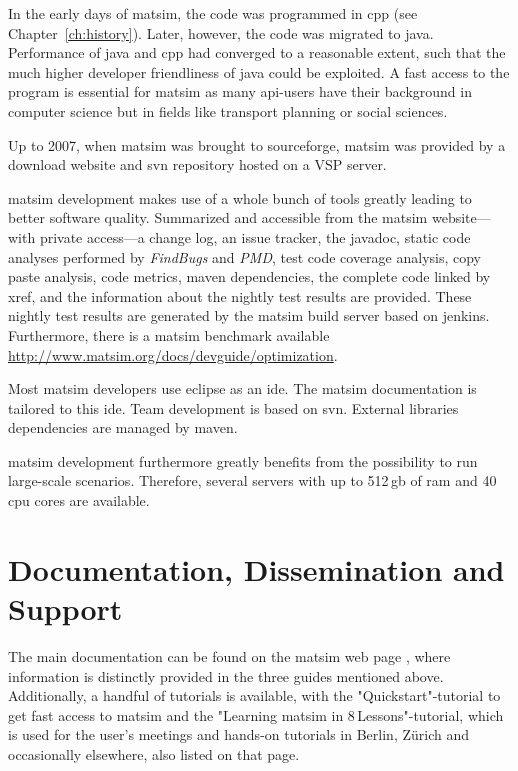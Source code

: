 In the early days of \gls{matsim}, the code was programmed in \gls{cpp} (see Chapter~\ref{ch:history}). Later, however, the code was migrated to \gls{java}. Performance of \gls{java} and \gls{cpp} had converged to a reasonable extent, such that the much higher developer friendliness of \gls{java} could be exploited. A fast access to the program is essential for \gls{matsim} as many \gls{api}-users have their background in computer science but in fields like transport planning or social sciences. 

Up to 2007, when \gls{matsim} was brought to \gls{sourceforge}, \gls{matsim} was provided by a download website and \gls{svn} repository hosted on a VSP server.

\gls{matsim} development makes use of a whole bunch of tools greatly leading to better software quality. Summarized and accessible from the \gls{matsim} website---with private access---a change log, an issue tracker, the \gls{javadoc}, static code analyses performed by \emph{FindBugs} and \emph{PMD}, test code coverage analysis, copy paste analysis, code metrics, \gls{maven} dependencies, the complete code linked by \gls{xref}, and the information about the nightly test results are provided. These nightly test results are generated by the \gls{matsim} build server based on \gls{jenkins}. Furthermore, there is a \gls{matsim} benchmark available \url{http://www.matsim.org/docs/devguide/optimization}.

Most \gls{matsim} developers use \gls{eclipse} as an \gls{ide}. The \gls{matsim} documentation is tailored to this \gls{ide}. Team development is based on \gls{svn}. External libraries dependencies are managed by \gls{maven}. 

\gls{matsim} development furthermore greatly benefits from the possibility to run large-scale scenarios. Therefore, several servers with up to 512\,\gls{gb} of \gls{ram} and 40\,\gls{cpu} cores are available.  

\section{Documentation, Dissemination and Support}
The main documentation can be found on the \gls{matsim} web page \citep[][]{MATSIM-Docu_Webpage_2015}, where information is distinctly provided in the three guides mentioned above. Additionally, a handful of tutorials is available, with the "Quickstart"-tutorial to get fast access to \gls{matsim} and the "Learning \gls{matsim} in 8\,Lessons"-tutorial, which is used for the user's meetings and hands-on tutorials in Berlin, Zürich and occasionally elsewhere, also listed on that page. 

